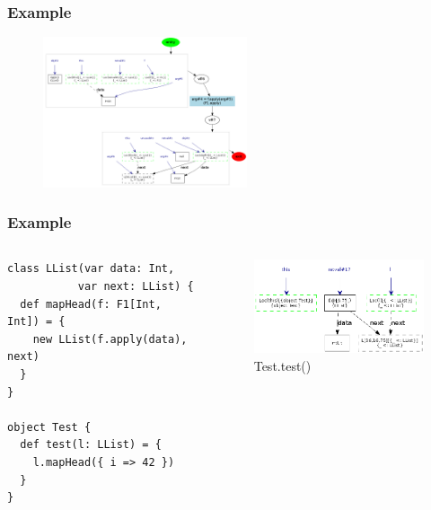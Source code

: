 \documentclass[hyperref={pdfpagelabels=false}]{beamer}
\begin{document}
\begin{frame}[fragile]
\frametitle{Example}
  \begin{figure}[t]
    \begin{center}
    \includegraphics[width=60mm]{images/e4.png}\\
    \end{center}
  \end{figure}
\end{frame}

\begin{frame}[fragile]
\frametitle{Example}
  \begin{columns}
    \begin{column}{0.4\textwidth}
\begin{lstlisting}[escapechar=\%]
class LList(var data: Int,
           var next: LList) {
  def mapHead(f: F1[Int, Int]) = {
    new LList(f.apply(data), next)
  }
}

object Test {
  def test(l: LList) = {
    l.mapHead({ i => 42 })
  }
}
\end{lstlisting}
    \end{column}
    \begin{column}{0.6\textwidth}
      \begin{figure}[t]
        \begin{center}
        \includegraphics[width=60mm]{images/e5.png}\\
        Test.test()
        \end{center}
      \end{figure}
    \end{column}
  \end{columns}
\end{frame}
\end{document}
